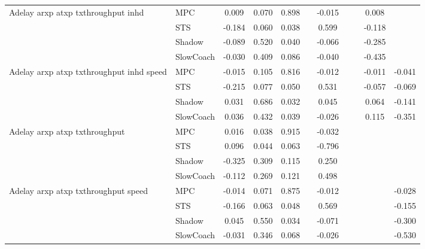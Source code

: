 \begin{tabular}{|l|l|*{9}{c|}}
\midrule
Adelay arxp atxp txthroughput inhd    & MPC &    0.009 &     0.070 &     0.898 &     & -0.015 &     &      &   0.008 &       \\
                              & STS &   -0.184 &     0.060 &     0.038 &     &  0.599 &     &      &  -0.118 &       \\
                              & Shadow &   -0.089 &     0.520 &     0.040 &     & -0.066 &     &      &  -0.285 &       \\
                              & SlowCoach &   -0.030 &     0.409 &     0.086 &     & -0.040 &     &      &  -0.435 &       \\
\midrule
Adelay arxp atxp txthroughput inhd speed    & MPC &   -0.015 &     0.105 &     0.816 &     & -0.012 &     &      &  -0.011 &   -0.041 \\
                              & STS &   -0.215 &     0.077 &     0.050 &     &  0.531 &     &      &  -0.057 &   -0.069 \\
                              & Shadow &    0.031 &     0.686 &     0.032 &     &  0.045 &     &      &   0.064 &   -0.141 \\
                              & SlowCoach &    0.036 &     0.432 &     0.039 &     & -0.026 &     &      &   0.115 &   -0.351 \\
\midrule
Adelay arxp atxp txthroughput    & MPC &    0.016 &     0.038 &     0.915 &     & -0.032 &     &      &      &       \\
                              & STS &    0.096 &     0.044 &     0.063 &     & -0.796 &     &      &      &       \\
                              & Shadow &   -0.325 &     0.309 &     0.115 &     &  0.250 &     &      &      &       \\
                              & SlowCoach &   -0.112 &     0.269 &     0.121 &     &  0.498 &     &      &      &       \\
\midrule
Adelay arxp atxp txthroughput speed    & MPC &   -0.014 &     0.071 &     0.875 &     & -0.012 &     &      &      &   -0.028 \\
                              & STS &   -0.166 &     0.063 &     0.048 &     &  0.569 &     &      &      &   -0.155 \\
                              & Shadow &    0.045 &     0.550 &     0.034 &     & -0.071 &     &      &      &   -0.300 \\
                              & SlowCoach &   -0.031 &     0.346 &     0.068 &     & -0.026 &     &      &      &   -0.530 \\

\end{tabular}
